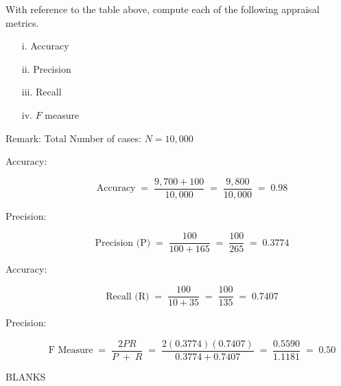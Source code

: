 \documentclass[a4paper,12pt]{article}
\begin{document}
\medskip 
\begin{framed}
\noindent With reference to the table above, compute each of the following appraisal metrics.
\begin{multicols}{2} 
	\begin{itemize}
		\item [i.] Accuracy
		\item [ii.] Precision
		\item [iii.] Recall
		\item [iv.] $F$ measure
	\end{itemize}
\end{multicols}
\end{framed}
\medskip 


\noindent Remark: Total Number of cases: $N=10,000$
\begin{description}
\item[Accuracy:]

\[ \mbox{Accuracy} \;=\;\frac{9,700 + 100}{10,000}  \;=\;\frac{9,800}{10,000} \;=\;0.98 \] 
\item[Precision:]

\[ \mbox{Precision (P)} \;=\;\frac{100}{100+165}  \;=\;\frac{100}{265} \;=\;0.3774 \] 
\item[Accuracy:]

\[ \mbox{Recall (R)} \;=\;\frac{100}{10+35}  \;=\;\frac{100}{135} \;=\;0.7407\] 
\item[Precision:]

\[ \mbox{F Measure} \;=\;\frac{2PR}{P\;+\;R}  \;=\;\frac{2(0.3774)(0.7407)}{ 0.3774 + 0.7407} \;=\;\frac{0.5590}{1.1181} \;=\;0.50 \] 
\end{description}

\newpage
BLANKS
\end{document}
